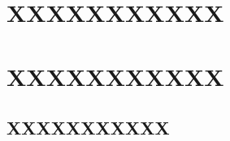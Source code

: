 \documentclass[
	12pt,				%
	openright,			%
	oneside,			%
	a4paper,			%
	chapter=TITLE,		%
	english,			%
	french,				%
	spanish,			%
	brazil				%
	]{abntex2}
\theoremstyle{definition}
\begin{document}








\postextual






\begin{apendicesenv}

	\partapendices

	\chapter{XXXXXXXXXXX}
	\label{cap:apêndices_a}
	
	\chapter{XXXXXXXXXXX}
	\label{cap:apêndices_b}



\end{apendicesenv}

\begin{anexosenv}

	\partanexos

    \chapter{XXXXXXXXXXX}
    \label{cap:anexo}


\end{anexosenv}
\end{document}
